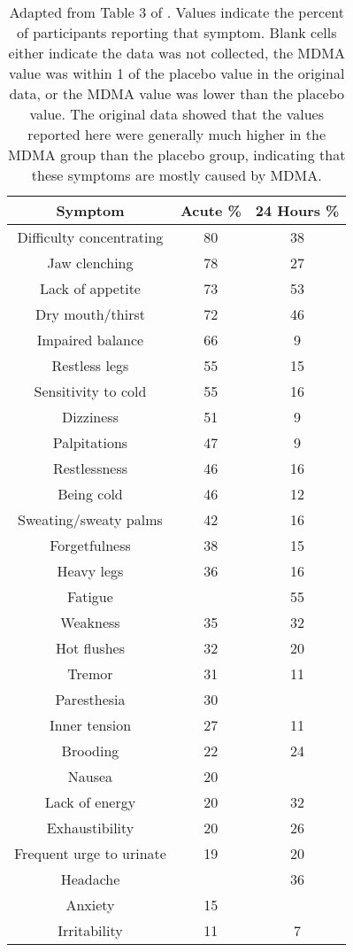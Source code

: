 \documentclass[12pt,letterpaper]{book}
\begin{document}
\begin{table}
    \centering
    \caption{Adapted from Table 3 of \textcite{liechtiGender}. Values indicate the percent of participants reporting that symptom. Blank cells either indicate the data was not collected, the MDMA value was within 1 of the placebo value in the original data, or the MDMA value was lower than the placebo value. The original data showed that the values reported here were generally much higher in the MDMA group than the placebo group, indicating that these symptoms are mostly caused by MDMA.}
    \label{table:sideeffects}
    \begin{tabular}{|c|c|c|}
    \hline
    \textbf{Symptom} & \textbf{Acute \%} & \textbf{24 Hours \%} \\ \hline
        Difficulty concentrating & 80 & 38 \\
        Jaw clenching            & 78 & 27 \\
        Lack of appetite         & 73 & 53 \\
        Dry mouth/thirst         & 72 & 46 \\
        Impaired balance         & 66 & 9  \\
        Restless legs            & 55 & 15 \\
        Sensitivity to cold      & 55 & 16 \\
        Dizziness                & 51 & 9  \\
        Palpitations             & 47 & 9  \\
        Restlessness             & 46 & 16 \\
        Being cold               & 46 & 12 \\
        Sweating/sweaty palms    & 42 & 16 \\
        Forgetfulness            & 38 & 15 \\
        Heavy legs               & 36 & 16 \\
        Fatigue                  &    & 55 \\
        Weakness                 & 35 & 32 \\
        Hot flushes              & 32 & 20 \\
        Tremor                   & 31 & 11 \\
        Paresthesia              & 30 &    \\
        Inner tension            & 27 & 11 \\
        Brooding                 & 22 & 24 \\
        Nausea                   & 20 &    \\
        Lack of energy           & 20 & 32 \\
        Exhaustibility           & 20 & 26 \\
        Frequent urge to urinate & 19 & 20 \\
        Headache                 &    & 36 \\
        Anxiety                  & 15 &    \\
        Irritability             & 11 & 7  \\
        \hline
    \end{tabular}
\end{table}
\FloatBarrier
\end{document}
